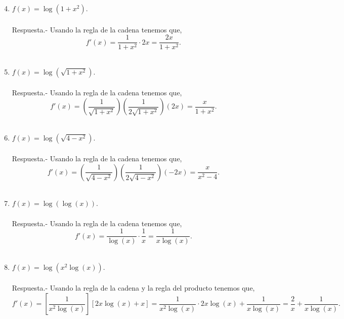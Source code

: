     \begin{enumerate}[\bfseries 1.]
    \setcounter{enumi}{3}

    \item $f(x)=\log\left(1+x^2\right)$.\\\\
	Respuesta.-\; Usando la regla de la cadena tenemos que,
	$$f'(x)= \dfrac{1}{1+x^2}\cdot 2x =\dfrac{2x}{1+x^2}.$$\\

    \item $f(x)=\log\left(\sqrt{1+x^2}\right)$.\\\\
	Respuesta.-\; Usando la regla de la cadena tenemos que,
	$$f'(x)= \left(\dfrac{1}{\sqrt{1+x^2}}\right)\left( \dfrac{1}{2\sqrt{1+x^2}}\right)(2x) =\dfrac{x}{1+x^2}.$$\\

    \item $f(x)=\log\left(\sqrt{4-x^2}\right)$.\\\\
	Respuesta.-\; Usando la regla de la cadena tenemos que,
	$$f'(x)= \left(\dfrac{1}{\sqrt{4-x^2}}\right)\left( \dfrac{1}{2\sqrt{4-x^2}}\right)(-2x) =\dfrac{x}{x^2-4}.$$\\

    \item $f(x)=\log\left(\log(x)\right)$.\\\\
	Respuesta.-\; Usando la regla de la cadena tenemos que,
	$$f'(x)= \dfrac{1}{\log(x)}\cdot \dfrac{1}{x} =\dfrac{1}{x\log(x)}.$$\\

    \item $f(x)=\log\left(x^2 \log(x)\right)$.\\\\
	Respuesta.-\; Usando la regla de la cadena y la regla del producto tenemos que,
	$$f'(x)= \left[\dfrac{1}{x^2\log(x)}\right]\left[2x\log(x) + x\right] =\dfrac{1}{x^2\log(x)}\cdot 2x\log(x)+\dfrac{1}{x\log(x)} =\dfrac{2}{x}+\dfrac{1}{x\log(x)}.$$\\


\end{enumerate}
